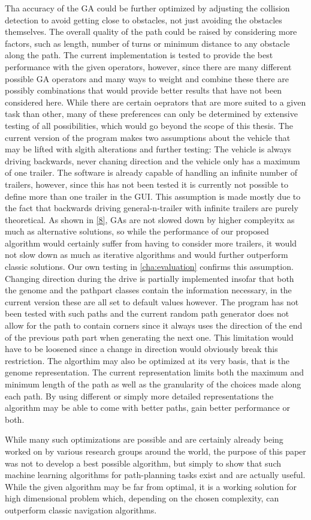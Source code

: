 Tha accuracy of the GA could be further optimized by adjusting the collision detection to avoid getting close to obstacles, not just avoiding the obstacles themselves. The overall quality of the path could be raised by considering more factors, such as length, number of turns or minimum distance to any obstacle along the path.
The current implementation is tested to provide the best performance with the given operators, however, since there are many different possible GA operators and many ways to weight and combine these there are possibly combinations that would provide better results that have not been considered here. While there are certain oeprators that are more suited to a given task than other, many of these preferences can only be determined by extensive testing of all possibilities, which would go beyond the scope of this thesis.
The current version of the program makes two assumptions about the vehicle that may be lifted with slgith alterations and further testing: The vehicle is always driving backwards, never chaning direction and the vehicle only has a maximum of one trailer. The software is already capable of handling an infinite number of trailers, however, since this has not been tested it is currently not possible to define more than one trailer in the GUI. This assumption is made mostly due to the fact that backwards driving general-n-trailer with infinite trailers are purely theoretical. As shown in \ref{8}, GAs are not slowed down by higher compleyitx as much as alternative solutions, so while the performance of our proposed algorithm would certainly suffer from having to consider more trailers, it would not slow down as much as iterative algorithms and would further outperform classic solutions. Our own testing in \ref{cha:evaluation} confirms this assumption.
Changing direction during the drive is partially implemented insofar that both the genome and the pathpart classes contain the information necessary, in the current version these are all set to default values however. The program has not been tested with such paths and the current random path generator does not allow for the path to contain corners since it always uses the direction of the end of the previous path part when generating the next one. This limitation would have to be loosened since a change in direction would obviously break this restriction.
The algorthim may also be optimized at its very basis, that is the genome representation. The current representation limits both the maximum and minimum length of the path as well as the granularity of the choices made along each path. By using different or simply more detailed representations the algorithm may be able to come with better paths, gain better performance or both.

While many such optimizations are possible and are certainly already being worked on by various research groups around the world, the purpose of this paper was not to develop a best possible algorithm, but simply to show that such machine learning algorithms for path-planning tasks exist and are actually useful. While the given algorithm may be far from optimal, it is a working solution for high dimensional problem which, depending on the chosen complexity, can outperform classic navigation algorithms.